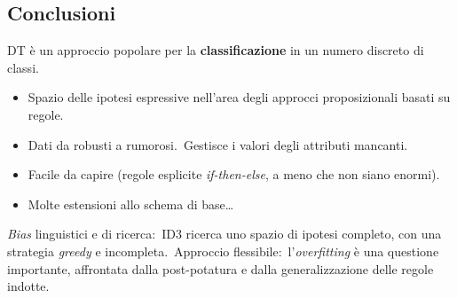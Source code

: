 \subsection{Conclusioni}

DT è un approccio popolare per la \textbf{classificazione} in un numero discreto di classi.
\begin{itemize}
	\item Spazio delle ipotesi espressive nell'area degli approcci proposizionali basati su regole.
	\item Dati da robusti a rumorosi.\ Gestisce i valori degli attributi mancanti.
	\item Facile da capire (regole esplicite \textit{if-then-else}, a meno che non siano enormi).\
	\item Molte estensioni allo schema di base\dots
\end{itemize}

\noindent \textit{Bias} linguistici e di ricerca:\ ID3 ricerca uno spazio di ipotesi completo, con una strategia \textit{greedy} e incompleta.\
Approccio flessibile:\ l'\textit{overfitting} è una questione importante, affrontata dalla post-potatura e dalla generalizzazione delle regole indotte.\
